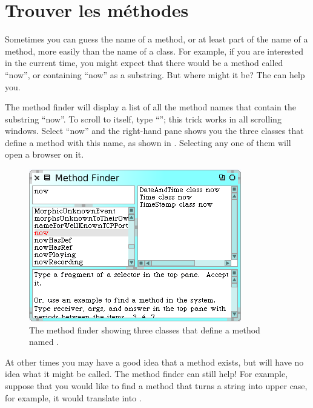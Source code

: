 \documentclass[a4paper,10pt,twoside]{book}
\begin{document}
\section{Trouver les m\'ethodes}
\label{sec:quick:methodFinder}

Sometimes you can guess the name of a method, or at least part of the name of a method, more easily than the name of a class.  For example, if you are interested in the current time, you might expect that there would be a method called ``now'', or containing ``now'' as a substring.   But where might it be?
The  can help you.

The method finder will display a list of all the method names that contain the substring ``now''.  
To scroll to  itself, type ``''; this trick works in all scrolling windows.  Select ``now'' and the right-hand pane shows you the three classes that define a method with this name, as shown in .  Selecting any one of them will open a browser on it.

\begin{figure}[hbt]
\centerline {\includegraphics[scale=0.7]{methodFinder-now}}
\caption{The method finder showing three classes that define a method named .
\label{fig:MethodFinder}}
\end{figure}

At other times you may have a good idea that a method exists, but will have no idea what it might be called.
The method finder can still help!  For example, suppose that you would like to find a method that turns a string into upper case, for example, it would translate  into .
\end{document}
